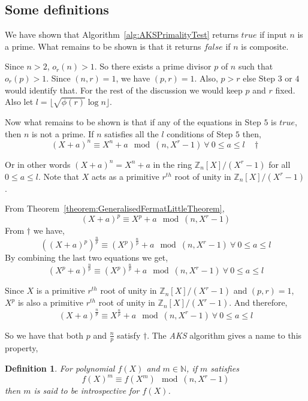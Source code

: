 \documentclass[11pt]{article}
\newtheorem{definition}{Definition}[section]
\begin{document}
\subsection{Some definitions}
We have shown that Algorithm~\ref{alg:AKSPrimalityTest} returns $true$ if input $n$ is a prime. What remains to be shown is that it returns $false$ if $n$ is composite.

Since $n > 2$, $o_r(n) > 1$. So there exists a prime divisor $p$ of $n$ such that $o_r(p) > 1$. Since $(n,r) = 1$, we have $(p,r) = 1$. Also, $p > r$ else Step $3$ or $4$ would identify that. For the rest of the discussion we would keep $p$ and $r$ fixed. Also let $l = \lfloor \sqrt{\phi(r)} \log n \rfloor$.

Now what remains to be shown is that if any of the equations in Step $5$ is $true$, then $n$ is not a prime. If $n$ satisfies all the $l$ conditions of Step $5$ then,
\[(X+a)^n \equiv X^n + a \mod (n, X^r - 1)\ \forall\ 0 \leq a \leq l \ \ \ \ \dagger\]

Or in other words $(X+a)^n = X^n + a$ in the ring $\mathbb{Z}_n[X]/(X^r-1)$ for all $0 \leq a \leq l$. Note that $X$ acts as a primitive $r^{th}$ root of unity in $\mathbb{Z}_n[X]/(X^r-1)$.

From Theorem~\ref{theorem:GeneralisedFermatLittleTheorem},
\[(X+a)^p \equiv X^p + a \mod (n,X^r-1)\]
From $\dagger$ we have, 
\[((X+a)^p)^{\frac{n}{p}} \equiv (X^p)^{\frac{n}{p}} + a \mod (n, X^r - 1)\ \forall\ 0 \leq a \leq l \]
By combining the last two equations we get,
\[(X^p+a)^{\frac{n}{p}} \equiv (X^p)^{\frac{n}{p}} + a \mod (n, X^r - 1)\ \forall\ 0 \leq a \leq l \]

Since $X$ is a primitive $r^{th}$ root of unity in $\mathbb{Z}_n[X]/(X^r-1)$ and $(p,r) = 1$, $X^p$ is also a primitive $r^{th}$ root of unity in $\mathbb{Z}_n[X]/(X^r-1)$. And therefore,
\[(X+a)^{\frac{n}{p}} \equiv X^{\frac{n}{p}} + a \mod (n, X^r - 1)\ \forall\ 0 \leq a \leq 
l \]

So we have that both $p$ and $\frac{n}{p}$ satisfy $\dagger$. The \emph{AKS} algorithm gives a name to this property,

\begin{definition}
\label{definition:introspective}
For polynomial $f(X)$ and $m \in \mathbb{N}$, if $m$ satisfies
\[f(X)^m \equiv f(X^m) \mod (n,X^r-1)\]
then $m$ is said to be introspective for $f(X)$.
\end{definition}
\end{document}
